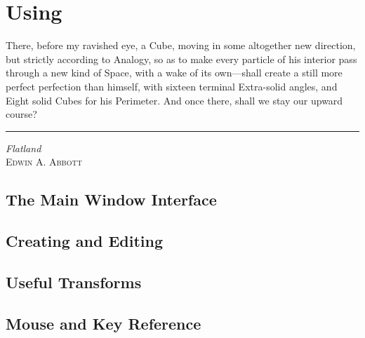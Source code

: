 \chapter{Using \dtypkgu{}}
\label{chap:using_epspline}

\ifMKwx
	\small
	There, before my ravished eye, a Cube, moving in some
	altogether new direction, but strictly according to
	Analogy, so as to make every particle of his interior
	pass through a new kind of Space, with a wake of
	its own---shall create a still more perfect
	perfection than himself, with sixteen terminal
	Extra-solid angles, and Eight solid Cubes for his
	Perimeter. And once there, shall we stay
	our upward course?\\
	\hrule%
	\textit{Flatland}\\ \textsc{Edwin A. Abbott}
	\normalsize
\else
\fi %


	\section{The Main Window Interface}%
	\label{sec:window_interface}
	

	\section{Creating and Editing}%
	\label{sec:creat_editing}
	

	\section{Useful Transforms}%
	\label{sec:useful_transforms}
	

	\section{Mouse and Key Reference}%
	\label{sec:mouse_key_ref}
	



